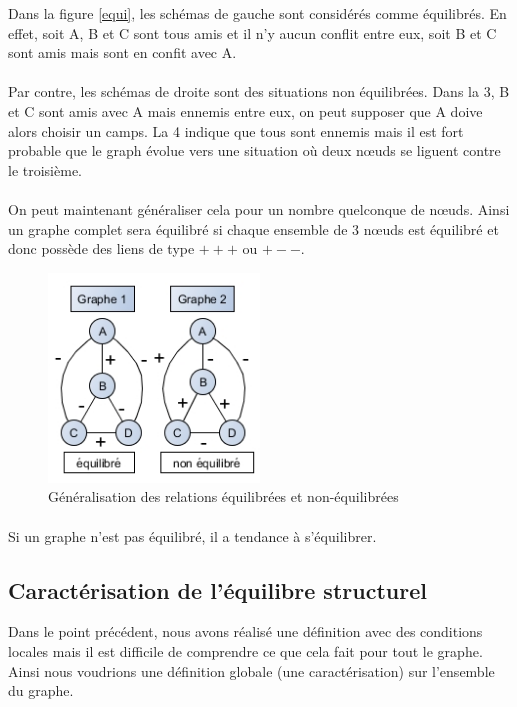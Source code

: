Dans la figure \ref{equi}, les schémas de gauche sont considérés comme équilibrés. En effet, soit A, B et C sont tous amis et il n'y aucun conflit entre eux, soit B et C sont amis mais sont en confit avec A. 
\paragraph{}
Par contre, les schémas de droite sont des situations non équilibrées. Dans la 3, B et C sont amis avec A mais ennemis entre eux, on peut supposer que A doive alors choisir un camps. La 4 indique que tous sont ennemis mais il est fort probable que le graph évolue vers une situation où deux nœuds se liguent contre le troisième. 

\paragraph{}
 
 On peut maintenant généraliser cela pour un nombre quelconque de nœuds. Ainsi un graphe complet sera équilibré si chaque ensemble de 3 nœuds est équilibré et donc possède des liens de type $+++$ ou $+--$.   

\begin{figure}[h!]
\label{equi2}
\caption{Généralisation des relations équilibrées et non-équilibrées}
\centering
\includegraphics[width=0.5\textwidth]{images/22_situation2.png}
\end{figure}

\paragraph{}
Si un graphe n'est pas équilibré, il a tendance à s'équilibrer. 


\subsection{Caractérisation de l'équilibre structurel} 
Dans le point précédent, nous avons réalisé une définition avec des conditions locales mais il est difficile de comprendre ce que cela fait pour tout le graphe.
Ainsi nous voudrions une définition globale (une caractérisation) sur l'ensemble du graphe.




